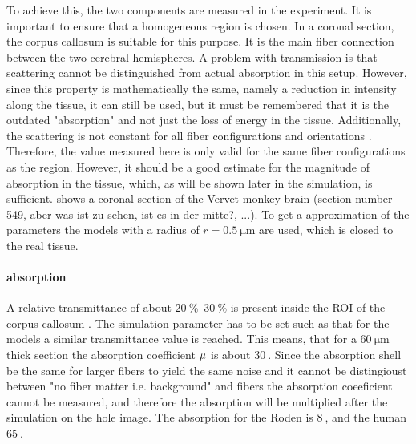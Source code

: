 To achieve this, the two components are measured in the experiment.
It is important to ensure that a homogeneous region is chosen.
In a coronal section, the corpus callosum is suitable for this purpose. It is the main fiber connection between the two cerebral hemispheres.
A problem with transmission is that scattering cannot be distinguished from actual absorption in this setup.
However, since this property is mathematically the same, namely a reduction in intensity along the tissue, it can still be used, but it must be remembered that it is the outdated "absorption" and not just the loss of energy in the tissue.
Additionally, the scattering is not constant for all fiber configurations and orientations \dummy{}.
Therefore, the value measured here is only valid for the same fiber configurations as the region.
However, it should be a good estimate for the magnitude of absorption in the tissue, which, as will be shown later in the simulation, is sufficient.
% 
 shows a coronal section of the Vervet monkey brain \dummy(section number 549, aber was ist zu sehen, ist es in der mitte?, ...).
% 
To get a approximation of the parameters the models with a radius of $r=\SI{0.5}{\micro\meter}$ are used, which is closed to the real tissue.
% 
% 
% 
\paragraph{absorption}
% 
A relative transmittance of about $\SIrange{20}{30}{\percent}$ is present inside the \ac{ROI} of the corpus callosum . 
The simulation parameter has to be set such as that for the models a similar transmittance value is reached.
This means, that for a $\SI{60}{\micro\meter}$ thick section the absorption coefficient $\textnormal{$\mu$}{}$ is about $\SI{30}{}$. 
Since the absorption shell be the same for larger fibers to yield the same noise and it cannot be distingioust between "no fiber matter i.e. background" and fibers the absorption coeeficient cannot be measured, and therefore the absorption will be multiplied after the simulation on the hole image. The absorption for the Roden is $\SI{8}{}$, and the human $\SI{65}{}$.

% 

